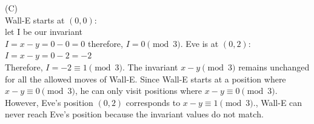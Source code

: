 \documentclass[solution,letterpaper]{cs20}
\begin{document}
\begin{problem}
\begin{solution}
        (C) \\
        Wall-E starts at $(0, 0)$: \\
        let I be our invariant \\
        \( I = x - y = 0 - 0 = 0 \) therefore, \( I = 0 \pmod{3} \).
        Eve is at $(0, 2)$: \\
        \( I = x - y = 0 - 2 = -2 \) \\
        Therefore, \( I = -2 \equiv 1 \pmod{3} \).
        The invariant \( x - y \pmod{3} \) remains unchanged for all the allowed moves of Wall-E. Since Wall-E starts at a position where \( x - y \equiv 0 \pmod{3} \), he can only visit positions where \( x - y \equiv 0 \pmod{3} \). However, Eve's position $(0, 2)$ corresponds to \( x - y \equiv 1 \pmod{3} \)., Wall-E can never reach Eve's position because the invariant values do not match.


        \end{solution}
    \end{problem}
\end{document}
